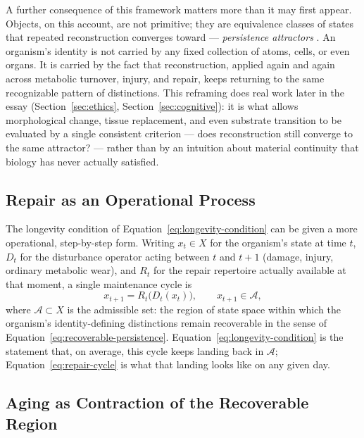 \documentclass[12pt]{article}
\begin{document}
A further consequence of this framework matters more than it may first appear. Objects, on this account, are not primitive; they are equivalence classes of states that repeated reconstruction converges toward --- \emph{persistence attractors} \cite{flyxion2026persistence}. An organism's identity is not carried by any fixed collection of atoms, cells, or even organs. It is carried by the fact that reconstruction, applied again and again across metabolic turnover, injury, and repair, keeps returning to the same recognizable pattern of distinctions. This reframing does real work later in the essay (Section~\ref{sec:ethics}, Section~\ref{sec:cognitive}): it is what allows morphological change, tissue replacement, and even substrate transition to be evaluated by a single consistent criterion --- does reconstruction still converge to the same attractor? --- rather than by an intuition about material continuity that biology has never actually satisfied.

\subsection{Repair as an Operational Process}

The longevity condition of Equation~\eqref{eq:longevity-condition} can be given a more operational, step-by-step form. Writing $x_t \in X$ for the organism's state at time $t$, $D_t$ for the disturbance operator acting between $t$ and $t+1$ (damage, injury, ordinary metabolic wear), and $R_t$ for the repair repertoire actually available at that moment, a single maintenance cycle is
\begin{equation}
x_{t+1} = R_t\big(D_t(x_t)\big), \qquad x_{t+1} \in \mathcal{A},
\label{eq:repair-cycle}
\end{equation}
where $\mathcal{A} \subset X$ is the admissible set: the region of state space within which the organism's identity-defining distinctions remain recoverable in the sense of Equation~\eqref{eq:recoverable-persistence}. Equation~\eqref{eq:longevity-condition} is the statement that, on average, this cycle keeps landing back in $\mathcal{A}$; Equation~\eqref{eq:repair-cycle} is what that landing looks like on any given day.

\subsection{Aging as Contraction of the Recoverable Region}
\label{sec:recoverable-region}
\end{document}
